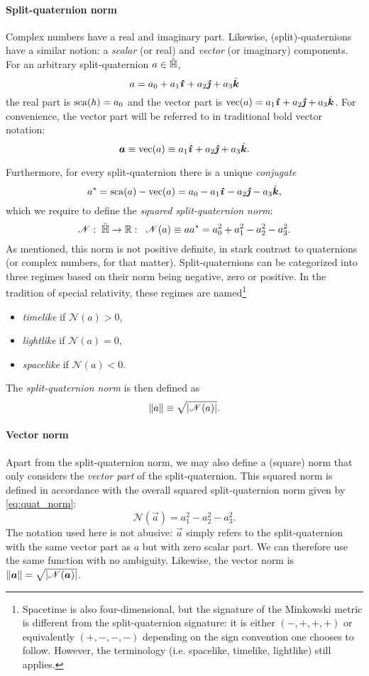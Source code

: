 \paragraph{Split-quaternion norm} Complex numbers have a real and imaginary part. Likewise, (split)-quaternions have a similar notion: a \emph{scalar} (or real) and \emph{vector} (or imaginary) components. For an arbitrary split-quaternion $a \in \hat{\mathbb{H}}$, \cite{Jafari2014}
$$ a = \quat{a_0}{a_1}{a_2}{a_3} $$
the real part is $\mathrm{sca}\qty(h) = a_0$ and the vector part is $ \vecpart{a} = \quatvec{a_1}{a_2}{a_3}$. For convenience, the vector part will be referred to in traditional bold vector notation:
$$ \vec{a} \equiv \vecpart{a} \equiv \quatvec{a_1}{a_2}{a_3}. $$

Furthermore, for every split-quaternion there is a unique \emph{conjugate}
$$ \conj{a} = \scapart{a} - \vecpart{a} = a_0 - a_1\quati - a_2\quatj - a_3\quatk, $$
which we require to define the \emph{squared split-quaternion norm}:
\begin{equation}
    \mathscr{N}:\;\hat{\mathbb{H}} \to \mathbb{R}:\;\;\mathscr{N}(a) \equiv aa^* = a_0^2 + a_1^2 - a_2^2 - a_3^2. 
    \label{eq:quat_norm}
\end{equation}
As mentioned, this norm is not positive definite, in stark contrast to quaternions (or complex numbers, for that matter). Split-quaternions can be categorized into three regimes based on their norm being negative, zero or positive. In the tradition of special relativity, these regimes are named\footnote
{Spacetime is also four-dimensional, but the signature of the Minkowski metric is different from the split-quaternion signature: it is either $(-, +, +, +)$ or equivalently $ (+, -, -, -)$ depending on the sign convention one chooses to follow. However, the terminology (i.e. spacelike, timelike, lightlike) still applies.} \cite{Misner1970,Landau1971}
\begin{itemize}
    \item \emph{timelike} if $ \mathscr{N}(a) > 0 $,
    \item \emph{lightlike} if $ \mathscr{N}(a) = 0 $, 
    \item \emph{spacelike} if $ \mathscr{N}(a) < 0 $.
\end{itemize}
The \emph{split-quaternion norm} is then defined as
$$ \norm{a} \equiv \sqrt{\abs{\mathscr{N}(a)}}. $$

\paragraph{Vector norm}
Apart from the split-quaternion norm, we may also define a (square) norm that only considers the \emph{vector part} of the split-quaternion. This squared norm is defined in accordance with the overall squared split-quaternion norm given by \cref{eq:quat_norm}:
$$ \mathscr{N}(\vec{a}) = a_1^2 - a^2_2 - a^2_3. $$
The notation used here is not abusive: $\vec{a}$ simply refers to the split-quaternion with the same vector part as $a$ but with zero scalar part. We can therefore use the same function with no ambiguity. Likewise, the vector norm is $ \norm{\vec{a}} = \sqrt{\abs{\mathscr{N}(\vec{a})}} $. 

